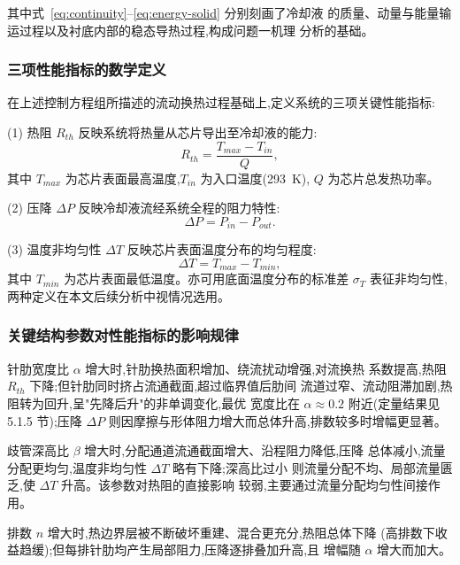 其中式~\eqref{eq:continuity}--\eqref{eq:energy-solid} 分别刻画了冷却液
的质量、动量与能量输运过程以及衬底内部的稳态导热过程,构成问题一机理
分析的基础\cite{Tao2001}。

\subsubsection{三项性能指标的数学定义}

在上述控制方程组所描述的流动换热过程基础上,定义系统的三项关键性能指标:

(1) 热阻 $R_{th}$ 反映系统将热量从芯片导出至冷却液的能力:
\begin{equation}
  R_{th} = \frac{T_{max} - T_{in}}{Q},
  \label{eq:rth}
\end{equation}
其中 $T_{max}$ 为芯片表面最高温度,$T_{in}$ 为入口温度(293~K),
$Q$ 为芯片总发热功率。

(2) 压降 $\Delta P$ 反映冷却液流经系统全程的阻力特性:
\begin{equation}
  \Delta P = P_{in} - P_{out}.
  \label{eq:dp}
\end{equation}

(3) 温度非均匀性 $\Delta T$ 反映芯片表面温度分布的均匀程度:
\begin{equation}
  \Delta T = T_{max} - T_{min},
  \label{eq:dT}
\end{equation}
其中 $T_{min}$ 为芯片表面最低温度。亦可用底面温度分布的标准差
$\sigma_T$ 表征非均匀性,两种定义在本文后续分析中视情况选用。

\subsubsection{关键结构参数对性能指标的影响规律}

针肋宽度比 $\alpha$ 增大时,针肋换热面积增加、绕流扰动增强,对流换热
系数提高,热阻 $R_{th}$ 下降;但针肋同时挤占流通截面,超过临界值后肋间
流道过窄、流动阻滞加剧,热阻转为回升,呈"先降后升"的非单调变化,最优
宽度比在 $\alpha\approx0.2$ 附近(定量结果见 5.1.5 节);压降 $\Delta P$
则因摩擦与形体阻力增大而总体升高,排数较多时增幅更显著。

歧管深高比 $\beta$ 增大时,分配通道流通截面增大、沿程阻力降低,压降
总体减小,流量分配更均匀,温度非均匀性 $\Delta T$ 略有下降;深高比过小
则流量分配不均、局部流量匮乏,使 $\Delta T$ 升高。该参数对热阻的直接影响
较弱,主要通过流量分配均匀性间接作用。

排数 $n$ 增大时,热边界层被不断破坏重建、混合更充分,热阻总体下降
(高排数下收益趋缓);但每排针肋均产生局部阻力,压降逐排叠加升高,且
增幅随 $\alpha$ 增大而加大。

